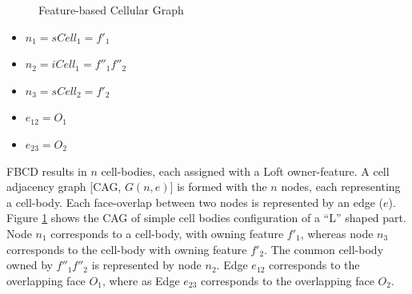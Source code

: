 \begin{figure}[!h]
\begin{minipage}[h]{0.3\linewidth}
\end{minipage}
\caption{Feature-based Cellular Graph}
\label{fig_featgraph}
\end{figure}

\begin{itemize}[noitemsep,topsep=2pt,parsep=2pt,partopsep=2pt,label={}]
\item $n_1 = sCell_1= f'_1$
\item $n_2 = iCell_1 = f''_1f''_2$
\item $n_3 = sCell_2 = f'_2$
\item $e_{12} = O_1$
\item $e_{23}= O_2$
\end{itemize}



FBCD results in $n$ cell-bodies, each assigned with a Loft owner-feature. A cell adjacency graph [CAG, $G(n,e)$] is formed with the $n$ nodes, each representing a cell-body. Each face-overlap between two nodes is represented by an edge ($e$).  Figure \ref{fig_featgraph} shows the CAG of simple cell bodies configuration of a ``L'' shaped part. Node $n_1$ corresponds to a cell-body, with owning feature $f'_1$, whereas node $n_3$ corresponds to the cell-body with owning feature $f'_2$. The common cell-body owned by $ f''_1f''_2$ is represented by node $n_2$.  Edge $e_{12}$ corresponds to the overlapping face $O_1$, where as  Edge $e_{23}$ corresponds to the overlapping face $O_2$. 

